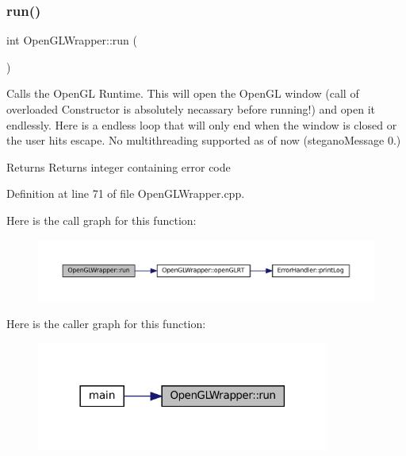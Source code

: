 \subsubsection{\texorpdfstring{run()}{run()}}
{\footnotesize\ttfamily int Open\+G\+L\+Wrapper\+::run (\begin{DoxyParamCaption}{ }\end{DoxyParamCaption})}



Calls the Open\+GL Runtime. This will open the Open\+GL window (call of overloaded Constructor is absolutely necassary before running!) and open it endlessly. Here is a endless loop that will only end when the window is closed or the user hits escape. No multithreading supported as of now (stegano\+Message 0.) 

\begin{DoxyReturn}{Returns}
Returns integer containing error code 
\end{DoxyReturn}


Definition at line 71 of file Open\+G\+L\+Wrapper.\+cpp.

Here is the call graph for this function\+:\nopagebreak
\begin{figure}[H]
\begin{center}
\leavevmode
\includegraphics[width=350pt]{classOpenGLWrapper_aac166dc029379011ed0a29c8f6d74776_cgraph}
\end{center}
\end{figure}
Here is the caller graph for this function\+:\nopagebreak
\begin{figure}[H]
\begin{center}
\leavevmode
\includegraphics[width=273pt]{classOpenGLWrapper_aac166dc029379011ed0a29c8f6d74776_icgraph}
\end{center}
\end{figure}
\mbox{\label{classOpenGLWrapper_a122d3908139936926442385921967157}} 

